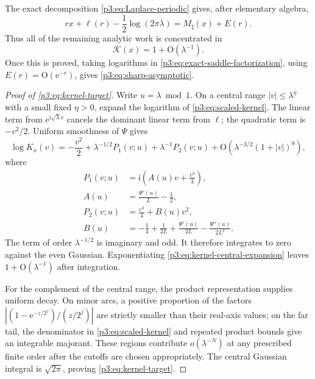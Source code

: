\documentclass[11pt]{article}
\numberwithin{equation}{section}
\theoremstyle{definition}
\theoremstyle{remark}
\newcommand{\e}{\mathrm e}
\newcommand{\ii}{\mathrm i}
\newcommand{\Oh}{\mathrm O}
\begin{document}
The exact decomposition \eqref{p3:eq:Laplace-periodic} gives, after elementary
algebra,
\begin{equation}\label{p3:eq:exact-saddle-action}
 rx+\ell(r)-\frac12\log(2\pi\lambda)
 =M_\sharp(x)+E(r).
\end{equation}
Thus all of the remaining analytic work is concentrated in
\begin{equation}\label{p3:eq:kernel-target}
 \mathcal K(x)=1+\Oh(\lambda^{-1}).
\end{equation}
Once this is proved, taking logarithms in
\eqref{p3:eq:exact-saddle-factorization}, using
$E(r)=\Oh(\e^{-r})$, gives \eqref{p3:eq:sharp-asymptotic}.

\begin{proof}[Proof of \eqref{p3:eq:kernel-target}]
Write $u=\lambda\bmod1$.  On a central range
$|v|\le\lambda^\eta$ with a small fixed $\eta>0$, expand the logarithm of
\eqref{p3:eq:scaled-kernel}.  The linear term from $\e^{\ii\sqrt\lambda v}$
cancels the dominant linear term from $\ell$; the quadratic term is
$-v^2/2$.  Uniform smoothness of $\Psi$ gives
\begin{equation}\label{p3:eq:kernel-central-expansion}
 \log K_x(v)=-\frac{v^2}{2}
 +\lambda^{-1/2}P_1(v;u)
 +\lambda^{-1}P_2(v;u)
 +\Oh\!\left(\lambda^{-3/2}(1+|v|)^9\right),
\end{equation}
where
\begin{align}
 P_1(v;u)&=\ii\left(A(u)v+\frac{v^3}{3}\right),
 \label{p3:eq:P1}\\
 A(u)&=\frac{\Psi'(u)}{L}-\frac12,
 \label{p3:eq:A-Psi}\\
 P_2(v;u)&=\frac{v^4}{4}+B(u)v^2,
 \label{p3:eq:P2}\\
 B(u)&=-\frac14+\frac1{2L}+\frac{\Psi'(u)}{2L}
      -\frac{\Psi''(u)}{2L^2}.
 \label{p3:eq:B-Psi}
\end{align}
The term of order $\lambda^{-1/2}$ is imaginary and odd.  It therefore
integrates to zero against the even Gaussian.  Exponentiating
\eqref{p3:eq:kernel-central-expansion} leaves $1+\Oh(\lambda^{-1})$ after
integration.

For the complement of the central range, the product representation supplies
uniform decay.  On minor arcs, a positive proportion of the factors
$|(1-\e^{-z/2^j})/(z/2^j)|$ are strictly smaller than their real-axis values;
on the far tail, the denominator in \eqref{p3:eq:scaled-kernel} and repeated
product bounds give an integrable majorant.  These regions contribute
$o(\lambda^{-N})$ at any prescribed finite order after the cutoffs are chosen
appropriately.  The central Gaussian integral is $\sqrt{2\pi}$, proving
\eqref{p3:eq:kernel-target}.
\end{proof}
\end{document}
